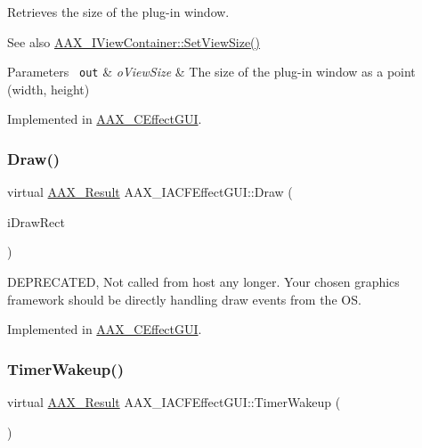 Retrieves the size of the plug-\/in window. 

\begin{DoxySeeAlso}{See also}
\mbox{\hyperlink{a01889_ad750e9f0231c61ab32114276ee8cb5f7}{A\+A\+X\+\_\+\+I\+View\+Container\+::\+Set\+View\+Size()}}
\end{DoxySeeAlso}

\begin{DoxyParams}[1]{Parameters}
\mbox{\texttt{ out}}  & {\em o\+View\+Size} & The size of the plug-\/in window as a point (width, height) \\
\hline
\end{DoxyParams}


Implemented in \mbox{\hyperlink{a01477_a23c51648957128cf563b31e1a5fbc249}{A\+A\+X\+\_\+\+C\+Effect\+G\+UI}}.

\mbox{\label{a01665_a4b132a0bc22ba443027998a56e4eadfb}} 
\subsubsection{\texorpdfstring{Draw()}{Draw()}}
{\footnotesize\ttfamily virtual \mbox{\hyperlink{a00392_a4d8f69a697df7f70c3a8e9b8ee130d2f}{A\+A\+X\+\_\+\+Result}} A\+A\+X\+\_\+\+I\+A\+C\+F\+Effect\+G\+U\+I\+::\+Draw (\begin{DoxyParamCaption}\item[{\mbox{\hyperlink{a01613}{A\+A\+X\+\_\+\+Rect}} $\ast$}]{i\+Draw\+Rect }\end{DoxyParamCaption})\hspace{0.3cm}{\ttfamily [pure virtual]}}



D\+E\+P\+R\+E\+C\+A\+T\+ED, Not called from host any longer. Your chosen graphics framework should be directly handling draw events from the OS. 



Implemented in \mbox{\hyperlink{a01477_a7a6e6ffea34c7c85f6e3d00bb6e564e0}{A\+A\+X\+\_\+\+C\+Effect\+G\+UI}}.

\mbox{\label{a01665_aafa484110d39046de1f927f30c9da387}} 
\subsubsection{\texorpdfstring{TimerWakeup()}{TimerWakeup()}}
{\footnotesize\ttfamily virtual \mbox{\hyperlink{a00392_a4d8f69a697df7f70c3a8e9b8ee130d2f}{A\+A\+X\+\_\+\+Result}} A\+A\+X\+\_\+\+I\+A\+C\+F\+Effect\+G\+U\+I\+::\+Timer\+Wakeup (\begin{DoxyParamCaption}{ }\end{DoxyParamCaption})\hspace{0.3cm}{\ttfamily [pure virtual]}}



